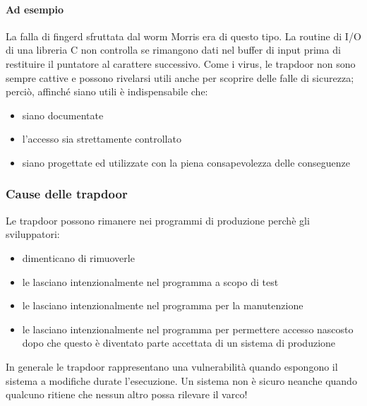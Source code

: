 \paragraph{Ad esempio} La falla di fingerd sfruttata dal worm Morris era di questo tipo. La routine di I/O di una libreria C non controlla se rimangono dati nel buffer di input prima di restituire il puntatore al carattere successivo.
\newline
Come i virus, le trapdoor non sono sempre cattive e possono rivelarsi utili anche per scoprire delle falle di sicurezza; perciò, affinché siano utili è indispensabile che:
\begin{itemize}
	\item siano documentate
	\item l'accesso sia strettamente controllato
	\item siano progettate ed utilizzate con la piena consapevolezza delle conseguenze
\end{itemize}

\subsubsection{Cause delle trapdoor}
Le trapdoor possono rimanere nei programmi di produzione perchè gli sviluppatori:
\begin{itemize}
	\item dimenticano di rimuoverle
	\item le lasciano intenzionalmente nel programma a scopo di test
	\item le lasciano intenzionalmente nel programma per la manutenzione
	\item le lasciano intenzionalmente nel programma per permettere accesso nascosto dopo che questo è diventato parte accettata di un sistema di produzione
\end{itemize}
In generale le trapdoor rappresentano una vulnerabilità quando espongono il sistema a modifiche durate l'esecuzione. Un sistema non è sicuro neanche quando qualcuno ritiene che nessun altro possa rilevare il varco!
